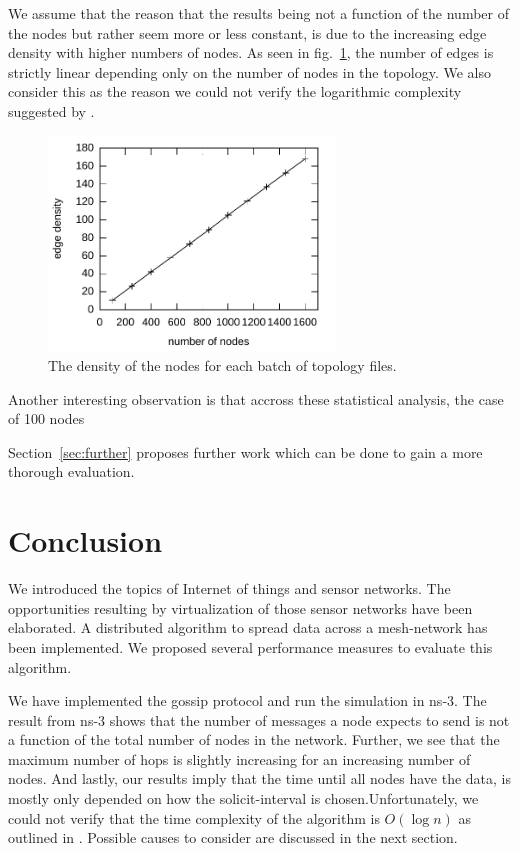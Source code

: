 \documentclass[12pt,journal]{IEEEtran}
\begin{document}
We assume that the reason that the results being not a function of the number of the nodes but rather seem more or less constant, is due to the increasing edge density with higher numbers of nodes. As seen in fig.~\ref{fig:density}, the number of edges is strictly linear depending only on the number of nodes in the topology. We also consider this as the reason we could not verify the logarithmic complexity suggested by \cite{gossip}.

\begin{figure}
	\centering
	\includegraphics[width=3in]{figs/density}
	\caption{The density of the nodes for each batch of topology files.}
	\label{fig:density}
\end{figure}

Another interesting observation is that accross these statistical analysis, the case of 100 nodes 

Section~\ref{sec:further} proposes further work which can be done to gain a more thorough evaluation.

\section{Conclusion}
We introduced the topics of Internet of things and sensor networks. The opportunities resulting by virtualization of those sensor networks have been elaborated. A distributed algorithm to spread data across a mesh-network has been implemented. We proposed several performance measures to evaluate this algorithm.

We have implemented the gossip protocol and run the simulation in ns-3. The result from ns-3 shows that the number of messages a node expects to send is not a function of the total number of nodes in the network. Further, we see that the maximum number of hops is slightly increasing for an increasing number of nodes. And lastly, our results imply that the time until all nodes have the data, is mostly only depended on how the solicit-interval is chosen.Unfortunately, we could not verify that the time complexity of the algorithm is $O(\log n)$ as outlined in \cite{gossip}. Possible causes to consider are discussed in the next section.
\end{document}

